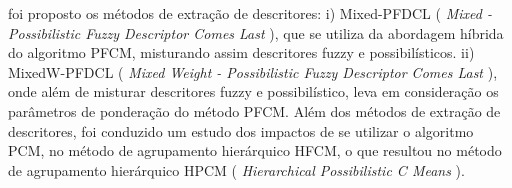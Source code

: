 foi proposto os métodos de extração de descritores: i) Mixed-PFDCL 
({ \it Mixed - Possibilistic Fuzzy Descriptor Comes Last\/ }), que se utiliza da abordagem híbrida do 
algoritmo PFCM, misturando assim descritores fuzzy e possibilísticos. ii) MixedW-PFDCL
({ \it Mixed Weight - Possibilistic Fuzzy Descriptor Comes Last\/ }), 
onde além de misturar descritores 
fuzzy e possibilístico, leva em consideração os parâmetros de ponderação do método PFCM.
Além dos métodos de extração de descritores, foi conduzido um estudo dos impactos de se utilizar o 
algoritmo PCM, no método de agrupamento hierárquico HFCM, o que resultou no método de 
agrupamento hierárquico HPCM ({ \it Hierarchical Possibilistic C Means\/ }).
